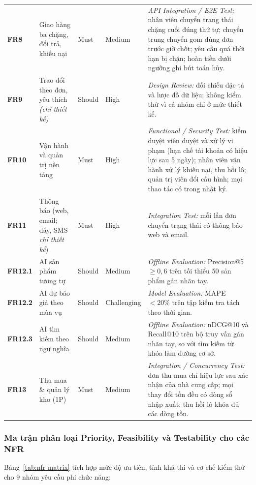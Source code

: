 \begin{longtable}{L{1.52cm} L{4.20cm} >{\centering\arraybackslash}p{1.65cm} >{\centering\arraybackslash}p{2.00cm} L{4.82cm}}
\textbf{FR8} & Giao hàng ba chặng, đổi trả, khiếu nại & Must & Medium & \textit{API Integration / E2E Test:} nhân viên chuyển trạng thái chặng cuối đúng thứ tự; chuyến trung chuyển gom đúng đơn trước giờ chốt; yêu cầu quá thời hạn bị chặn; hoàn tiền dưới ngưỡng ghi bút toán hủy. \\
\textbf{FR9} & Trao đổi theo đơn, yêu thích \textit{(chỉ thiết kế)} & Should & High & \textit{Design Review:} đối chiếu đặc tả và lược đồ dữ liệu; không kiểm thử vì cả nhóm chỉ ở mức thiết kế. \\
\textbf{FR10} & Vận hành và quản trị nền tảng & Must & High & \textit{Functional / Security Test:} kiểm duyệt viên duyệt và xử lý vi phạm (hạn chế tài khoản có hiệu lực sau 5 ngày); nhân viên vận hành xử lý khiếu nại, thu hồi lô; quản trị viên đổi cấu hình; mọi thao tác có trong nhật ký. \\
\textbf{FR11} & Thông báo (web, email; đẩy, SMS \textit{chỉ thiết kế}) & Must & High & \textit{Integration Test:} mỗi lần đơn chuyển trạng thái có thông báo web và email. \\
\textbf{FR12.1} & AI sản phẩm tương tự & Should & Medium & \textit{Offline Evaluation:} Precision@5 $\ge 0{,}6$ trên tối thiểu 50 sản phẩm gán nhãn tay. \\
\textbf{FR12.2} & AI dự báo giá theo mùa vụ & Should & Challenging & \textit{Model Evaluation:} MAPE $< 20\%$ trên tập kiểm tra tách theo thời gian. \\
\textbf{FR12.3} & AI tìm kiếm theo ngữ nghĩa & Should & Medium & \textit{Offline Evaluation:} nDCG@10 và Recall@10 trên bộ truy vấn gán nhãn tay, so với tìm kiếm từ khóa làm đường cơ sở. \\
\textbf{FR13} & Thu mua \& quản lý kho (1P) & Must & Medium & \textit{Integration / Concurrency Test:} đơn thu mua chỉ hiệu lực sau xác nhận của nhà cung cấp; mọi thay đổi tồn đều có dòng sổ nhập xuất; thu hồi lô khóa đủ các dòng tồn. \\
\end{longtable}
\endgroup
\subsubsection*{Ma trận phân loại Priority, Feasibility và Testability cho các NFR}
\label{subsec:nfr-matrix}

Bảng~\ref{tab:nfr-matrix} tích hợp mức độ ưu tiên, tính khả thi và cơ chế kiểm thử cho 9 nhóm yêu cầu phi chức năng:


